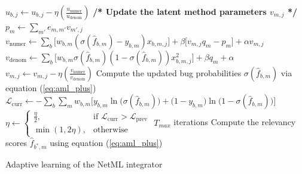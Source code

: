 \begin{algorithm*}[!ht]
\begin{algorithmic}[1]
		\State $u_{b,j} \leftarrow u_{b,j} - \eta \left( \frac{u_\text{numer}}{u_\text{denom}} \right)$
		\EndFor
		\State \textbf{/* Update the latent method parameters $v_{m,j}$ */}
		\State $p_{m} \leftarrow \sum_{m'} e_{m,m'} v_{m',j}$
		\EndFor
		\State $v_\text{numer} \leftarrow \sum_b \big[ w_{b,m} (\sigma(\hat{f}_{b,m}) - y_{b,m}) x_{b,m,j} \big] + \beta \big[ v_{m,j} q_m - p_{m} \big] + \alpha v_{m,j}$
		\State $v_\text{denom} \leftarrow \sum_b \big[ w_{b,m} \sigma(\hat{f}_{b,m}) (1 - \sigma(\hat{f}_{b,m})) x_{b,m,j}^2 \big] + \beta q_m + \alpha$
		\State $v_{m,j} \leftarrow v_{m,j} - \eta \left( \frac{v_\text{numer}}{v_\text{denom}} \right)$
		\EndFor
		\EndFor
		\State Compute the updated bug probabilities $\sigma(\hat{f}_{b,m})$ via equation (\ref{eq:aml_plus})
		\State $\mathcal{L}_\text{curr} \leftarrow -\sum_{b} \sum_{m} w_{b,m} \big[ y_{b,m} \ln \big( \sigma(\hat{f}_{b,m}) \big) + \big( 1 - y_{b,m} \big) \ln \big(1 - \sigma(\hat{f}_{b,m}) \big) \big]$
		\State $\eta \leftarrow
		\begin{cases}
		\frac{\eta}{2},   & \text{if } \mathcal{L}_\text{curr} > \mathcal{L}_\text{prev}\\
		\min(1, 2 \eta),  & \text{otherwise}
		\end{cases}$
		\Until $T_{max}$ iterations
		\State Compute the relevancy scores $\hat{f}_{b^*,m}$ using equation (\ref{eq:aml_plus})
	\end{algorithmic}
	\caption{Adaptive learning of the NetML integrator}
	\label{alg:network_lasso}
\end{algorithm*}



